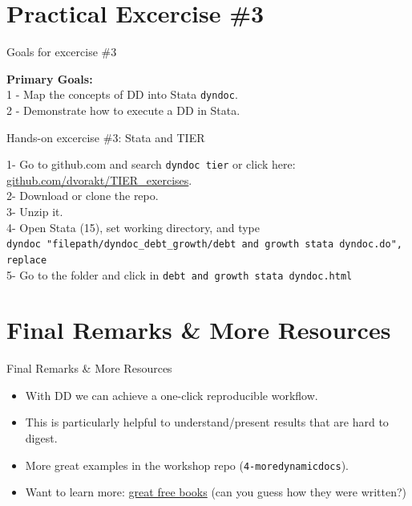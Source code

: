 \documentclass[ignorenonframetext,]{beamer}
\providecommand{\tightlist}{%
  \setlength{\itemsep}{0pt}\setlength{\parskip}{0pt}}
\begin{document}
\hypertarget{practical-excercise-3}{%
\section{Practical Excercise \#3}\label{practical-excercise-3}}

\begin{frame}[fragile]{Goals for excercise \#3}
\protect\hypertarget{goals-for-excercise-3}{}

\textbf{Primary Goals:}\\
1 - Map the concepts of DD into Stata \texttt{dyndoc}.\\
2 - Demonstrate how to execute a DD in Stata.

\end{frame}

\begin{frame}[fragile]{Hands-on excercise \#3: Stata and TIER}
\protect\hypertarget{hands-on-excercise-3-stata-and-tier}{}

1- Go to github.com and search \texttt{dyndoc\ tier} or click here:
\href{https://github.com/dvorakt/TIER_exercises}{github.com/dvorakt/TIER\_exercises}.\\
2- Download or clone the repo.\\
3- Unzip it.\\
4- Open Stata (15), set working directory, and type
\texttt{dyndoc\ "filepath/dyndoc\_debt\_growth/debt\ and\ growth\ stata\ dyndoc.do",\ replace}\\
5- Go to the folder and click in
\texttt{debt\ and\ growth\ stata\ dyndoc.html}

\end{frame}

\hypertarget{final-remarks-more-resources}{%
\section{Final Remarks \& More
Resources}\label{final-remarks-more-resources}}

\begin{frame}[fragile]{Final Remarks \& More Resources}
\protect\hypertarget{final-remarks-more-resources-1}{}

\begin{itemize}
\tightlist
\item
  With DD we can achieve a one-click reproducible workflow.
\item
  This is particularly helpful to understand/present results that are
  hard to digest.
\item
  More great examples in the workshop repo (\texttt{4-moredynamicdocs}).
\item
  Want to learn more: \href{https://bookdown.org/}{great free books}
  (can you guess how they were written?)
\end{itemize}

\end{frame}
\end{document}
